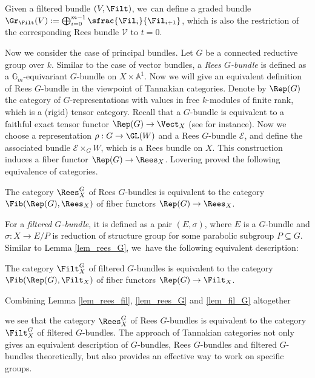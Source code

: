 \begin{rem}\label{rem_graded}
Given a filtered bundle $(V, \Filt)$, we~can define a graded bundle $\Gr_{\Filt}(V) := \bigoplus_{i=0}^{m-1} \sfrac{\Fil_i}{\Fil_{i+1}}$, which is also the restriction of the corresponding Rees bundle $\mathcal{V}$ to $t= 0$.
\end{rem}

Now we consider the case of principal bundles. Let $G$ be a connected reductive group over $k$. Similar to the case of vector bundles, a \emph{Rees $G$-bundle} is defined as a $\mathbb{G}_m$-equivariant $G$-bundle on $X \times \mathbb{A}^1$. Now we will give an equivalent definition of Rees $G$-bundle in the viewpoint of Tannakian categories. Denote by $\Rep(G)$ the category of $G$-representations with values in free $k$-modules of finite rank, which is a (rigid) tensor category. Recall that a $G$-bundle is equivalent to a faithful exact tensor functor $\Rep(G) \to \Vect_X$ (see \cite[\S 6]{Si92} for instance). Now we choose a representation $\rho : G \to \GL(W)$ and a Rees $G$-bundle $\mathcal{E}$, and define the associated bundle $\mathcal{E} \times_G W$, which is a Rees bundle on $X$. This construction induces a fiber functor $\Rep(G) \to \Rees_X$. Lovering proved the following equivalence of categories.

\begin{lem}[{\cite[Prop.\,2.2.7]{Lo17b}}]\label{lem_rees_G}
The category $\Rees^G_X$ of Rees $G$-bundles is equivalent to the category $\Fib(\Rep(G), \Rees_X)$ of fiber functors $\Rep(G) \to \Rees_X$.
\end{lem}

For a \emph{filtered $G$-bundle}, it is defined as a pair $(E,\sigma)$, where $E$ is a $G$-bundle and $\sigma: X \to E/P$ is reduction of structure group for some parabolic subgroup $P \subseteq G$. Similar to Lemma \ref{lem_rees_G}, we~have the following equivalent description:

\begin{lem}[{\cite[\S3]{Lo17a}}]\label{lem_fil_G}
The category $\Filt_X^G$ of filtered $G$-bundles is equivalent to the category $\Fib(\Rep(G), \Filt_X)$ of fiber functors $\Rep(G) \to \Filt_X$.
\end{lem}

Combining Lemma \ref{lem_rees_fil}, \ref{lem_rees_G} and \ref{lem_fil_G} altogether
\begin{center}
\end{center}
we see that the category $\Rees^G_X$ of Rees $G$-bundles is equivalent to the category $\Filt^G_X$ of filtered $G$-bundles. The approach of Tannakian categories not only gives an equivalent description of $G$-bundles, Rees $G$-bundles and filtered $G$-bundles theoretically, but also provides an effective way to work on specific groups.

